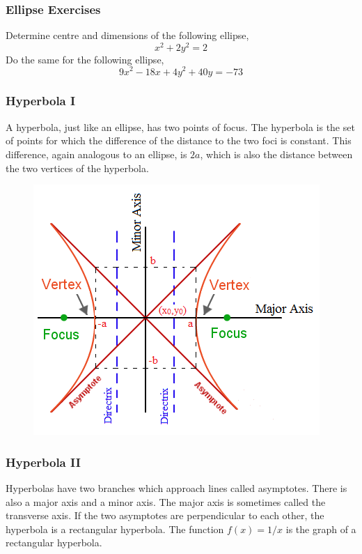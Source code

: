 \documentclass[xcolor=dvipsnames]{beamer}
\begin{document}
\begin{frame}
  \frametitle{Ellipse Exercises}
Determine centre and dimensions of the following ellipse,
\begin{equation}
  \label{eq:veatoiyu}
x^{2}+2y^{2}=2  
\end{equation}
Do the same for the following ellipse,
\begin{equation}
  \label{eq:kohvoigh}
9x^{2}-18x+4y^{2}+40y=-73
\end{equation}
\end{frame}

\begin{frame}
  \frametitle{Hyperbola I}
  A hyperbola, just like an ellipse, has two points of \alert{focus}.
  The hyperbola is the set of points for which the difference of the
  distance to the two foci is constant. This difference, again
  analogous to an ellipse, is $2a$, which is also the distance between
  the two \alert{vertices} of the hyperbola. 
  \begin{figure}[h]
    \includegraphics[scale=.6]{./hyperbola.png}
  \end{figure}
\end{frame}

\begin{frame}
  \frametitle{Hyperbola II}
  Hyperbolas have two branches which approach lines called
  \alert{asymptotes}. There is also a \alert{major axis} and a
  \alert{minor axis}. The major axis is sometimes called the
  \alert{transverse axis}. If the two asymptotes are perpendicular to
  each other, the hyperbola is a \alert{rectangular hyperbola}. The
  function $f(x)=1/x$ is the graph of a rectangular hyperbola.
\end{frame}
\end{document}
